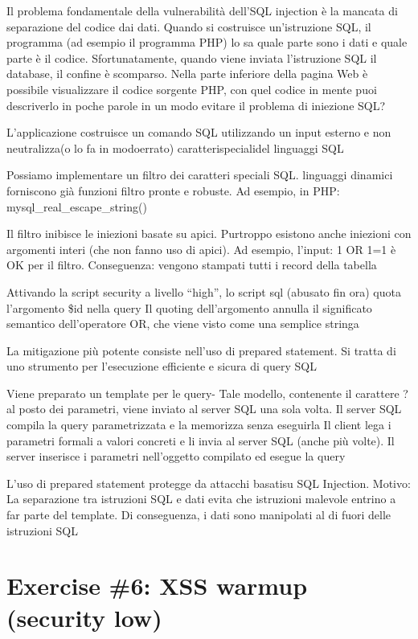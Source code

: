 \documentclass[11pt]{article}
\begin{document}
    Il problema fondamentale della vulnerabilità dell'SQL injection è la
mancata di separazione del codice dai dati. Quando si costruisce
un'istruzione SQL, il programma (ad esempio il programma PHP) lo sa
quale parte sono i dati e quale parte è il codice. Sfortunatamente,
quando viene inviata l'istruzione SQL il database, il confine è
scomparso. Nella parte inferiore della pagina Web è possibile
visualizzare il codice sorgente PHP, con quel codice in mente puoi
descriverlo in poche parole in un modo evitare il problema di iniezione
SQL?

    L'applicazione costruisce un comando SQL utilizzando un input esterno e
non neutralizza(o lo fa in modoerrato) caratterispecialidel linguaggi
SQL

Possiamo implementare un filtro dei caratteri speciali SQL. linguaggi
dinamici forniscono già funzioni filtro pronte e robuste. Ad esempio, in
PHP: mysql\_real\_escape\_string()

Il filtro inibisce le iniezioni basate su apici. Purtroppo esistono
anche iniezioni con argomenti interi (che non fanno uso di apici). Ad
esempio, l'input: 1 OR 1=1 è OK per il filtro. Conseguenza: vengono
stampati tutti i record della tabella

Attivando la script security a livello ``high'', lo script sql (abusato
fin ora) quota l'argomento \$id nella query Il quoting dell'argomento
annulla il significato semantico dell'operatore OR, che viene visto come
una semplice stringa

La mitigazione più potente consiste nell'uso di prepared statement. Si
tratta di uno strumento per l'esecuzione efficiente e sicura di query
SQL

Viene preparato un template per le query- Tale modello, contenente il
carattere ? al posto dei parametri, viene inviato al server SQL una sola
volta. Il server SQL compila la query parametrizzata e la memorizza
senza eseguirla Il client lega i parametri formali a valori concreti e
li invia al server SQL (anche più volte). Il server inserisce i
parametri nell'oggetto compilato ed esegue la query

L'uso di prepared statement protegge da attacchi basatisu SQL Injection.
Motivo: La separazione tra istruzioni SQL e dati evita che istruzioni
malevole entrino a far parte del template. Di conseguenza, i dati sono
manipolati al di fuori delle istruzioni SQL

    \hypertarget{exercise-6-xss-warmup-security-low}{%
\section{Exercise \#6: XSS warmup (security
low)}\label{exercise-6-xss-warmup-security-low}}
\end{document}
